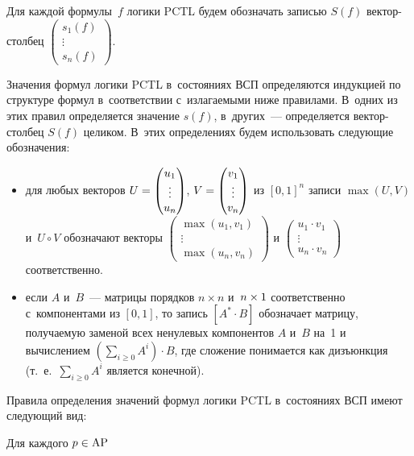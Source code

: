 \begin{multicols}{2}
Для каждой формулы~$f$ логики PCTL
будем обозначать записью $S(f)$ век\-тор-столбец
$
\begin{pmatrix}
 s_1(f)\\
 \vdots\\
 s_n(f)
\end{pmatrix}.$

Значения формул логики PCTL в~состояниях ВСП определяются индукцией
по структуре формул в~соответствии с~излагаемыми ниже правилами.
В~одних из этих правил определяется значение $s(f)$, в~других~--- определяется
век\-тор-стол\-бец $S(f)$ целиком. В~этих определениях будем использовать следующие обозначения:
\begin{itemize}
\item для любых векторов $U\hm=\begin{pmatrix}
    u_1\\ \vdots\\u_n
\end{pmatrix}$, $V\hm=\begin{pmatrix}
    v_1\\ \vdots\\v_n
\end{pmatrix}$
из $[0,1]^n$ записи $\max(U,V)$ и~$U\circ V$    обозначают векторы
      $ \begin{pmatrix}
      \max(u_1,v_1)\\ \vdots\\ \max(u_n,v_n)
\end{pmatrix}$ и
$\begin{pmatrix} u_1\cdot v_1\\ \vdots\\ u_n \cdot v_n
\end{pmatrix}
$
соответственно.
   \item
   если $A$ и~$B$~--- матрицы порядков $n\times n$
   и~$n\hm\times 1$ соответственно с~компонентами из $[0,1]$,
   то запись $[A^*\cdot B]$ обозначает матрицу, получаемую
заменой
   всех ненулевых компонентов $A$ и~$B$ на~1 и
вычислением $(\sum\limits_{i\geq 0}A^i)\cdot B$, где сложение
понимается как дизъюнкция (т.~е.\ $\sum\limits_{i\geq 0}A^i$
является конечной). %
\end{itemize}

Правила определения значений формул логики PCTL
в~состояниях ВСП имеют следующий вид:
\bi
\item
Для каждого $p\hm\in \mathrm{AP}$


\end{multicols}
